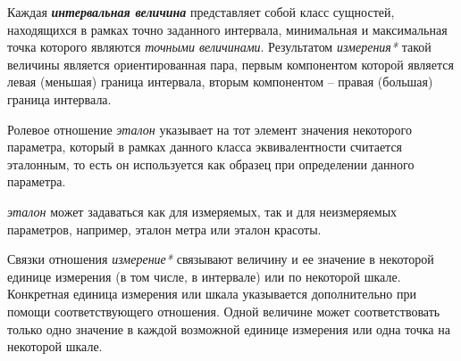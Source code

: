 Каждая \textbf{\textit{интервальная величина}} представляет собой класс сущностей, находящихся в рамках точно заданного интервала, минимальная и максимальная точка которого являются \textit{точными величинами}. Результатом \textit{измерения*} такой величины является ориентированная пара, первым компонентом которой является левая (меньшая) граница интервала, вторым компонентом -- правая (большая) граница интервала.

\begin{SCn}
\end{SCn}

\begin{SCn}
Ролевое отношение \textit{эталон\scnrolesign} указывает на тот элемент значения некоторого параметра, который в рамках данного класса эквивалентности считается эталонным, то есть он используется как образец при определении данного параметра.
\end{SCn}
		
\begin{SCn}
\textit{эталон\scnrolesign} может задаваться как для измеряемых, так и для неизмеряемых параметров, например, эталон метра или эталон красоты.
\end{SCn}
	
\begin{SCn}
\end{SCn}

Связки отношения \textit{измерение*} связывают величину и ее значение в некоторой единице измерения (в том числе, в интервале) или по некоторой шкале. Конкретная единица измерения или шкала указывается дополнительно при помощи соответствующего отношения. Одной величине может соответствовать только одно значение в каждой возможной единице измерения или одна точка на некоторой шкале.
	
	
\begin{SCn}
\end{SCn}

